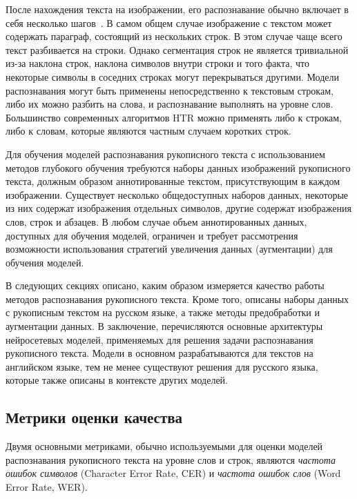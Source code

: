 После нахождения текста на изображении, его распознавание обычно включает в себя несколько шагов~\cite{plamondon2000online}.
В самом общем случае изображение с текстом может содержать параграф, состоящий из нескольких строк.
В этом случае чаще всего текст разбивается на строки.
Однако сегментация строк не является тривиальной из-за наклона строк, наклона символов внутри строки и того факта,
что некоторые символы в соседних строках могут перекрываться другими.
Модели распознавания могут быть применены непосредственно к текстовым строкам, либо их можно разбить на слова, и распознавание выполнять на уровне слов.
Большинство современных алгоритмов HTR можно применять либо к строкам, либо к словам, которые являются частным случаем коротких строк.

Для обучения моделей распознавания рукописного текста с использованием методов глубокого обучения
требуются наборы данных изображений рукописного текста, должным образом аннотированные текстом, присутствующим в каждом изображении.
Существует несколько общедоступных наборов данных, некоторые из них содержат изображения отдельных символов,
другие содержат изображения слов, строк и абзацев.
В любом случае объем аннотированных данных, доступных для обучения моделей, ограничен и требует рассмотрения возможности
использования стратегий увеличения данных (аугментации) для обучения моделей.

В следующих секциях описано, каким образом измеряется качество работы методов распознавания рукописного текста.
Кроме того, описаны наборы данных с рукописным текстом на русском языке, а также методы предобработки и аугментации данных.
В заключение, перечисляются основные архитектуры нейросетевых моделей, применяемых для решения задачи распознавания рукописного текста.
Модели в основном разрабатываются для текстов на английском языке, тем не менее существуют решения для русского языка,
которые также описаны в контексте других моделей.


\subsection{Метрики оценки качества}
\label{subsec:evaluation-metrics}

Двумя основными метриками, обычно используемыми для оценки моделей распознавания рукописного текста на уровне слов и строк,
являются \textit{частота ошибок символов} (Character Error Rate, CER) и \textit{частота ошибок слов} (Word Error Rate, WER).

